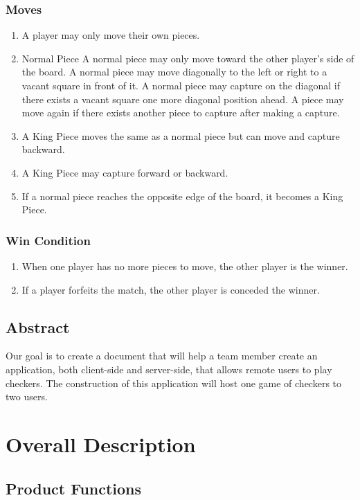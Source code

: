 \documentclass[10pt]{article}
\begin{document}
\subsubsection{Moves} 
\begin{enumerate}
    \item A player may only move their own pieces.
    \item Normal Piece
        \subitem A normal piece may only move toward the other player's side of the board.
        \subitem A normal piece may move diagonally to the left or right to a vacant square in front of it.
        \subitem A normal piece may capture on the diagonal if there exists a vacant square one more diagonal position ahead.
            \subsubitem A piece may move again if there exists another piece to capture after making a capture.
    \item A King Piece moves the same as a normal piece but can move and capture backward.
    \item A King Piece may capture forward or backward.
    \item If a normal piece reaches the opposite edge of the board, it becomes a King Piece.
\end{enumerate}   

\subsubsection{Win Condition}
\begin{enumerate}
    \item When one player has no more pieces to move, the other player is the winner.
    \item If a player forfeits the match, the other player is conceded the winner.
\end{enumerate}

\subsection{Abstract}

Our goal is to create a document that will help a team member create an application, 
both client-side and server-side, that allows remote users to play checkers. The construction of this application will host one game of checkers to two users. 
\section{Overall Description}

\subsection{Product Functions}
\end{document}
